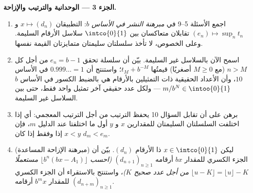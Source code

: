 \begin{problem}
\medskip
\noindent\textbf{الجزء 3 --- الوحدانية والترتيب والإزاحة.}
\begin{enumerate}[resume]
  \item اجمع الأسئلة 5--9 في \emph{مبرهنة النشر في الأساس
        $b$}: التطبيقان $x \mapsto (d_n)$ و $(e_n) \mapsto
        \sup_n t_n$ تقابلان متعاكسان بين
        $\intco{0}{1}$  سلاسل الأرقام السليمة. وعلى
        الخصوص، لا تأخذ سلسلتان سليمتان متمايزتان القيمة نفسها.
  \item اسمح الآن بالسلاسل غير السليمة. بيّن أن سلسلة تحقق $e_n
        = b - 1$ من أجل كل $n > M$ (مع $M \geq 0$ أصغريًا) قيمتُها
        $t_M + b^{-M}$؛ واستنتج أن $0.999\dots = 1$ في
        الأساس $10$، وأن الأعداد الحقيقية ذات التمثيلين
        بالأرقام هي بالضبط الكسور في الأساس $b$
        $m/b^N \in \intoo{0}{1}$ --- ولكل عدد حقيقي آخر تمثيل
        واحد فقط، حتى بين السلاسل غير السليمة.
  \item برهن على أن تقابل السؤال 10 يحفظ
        الترتيب من أجل الترتيب المعجمي: أي إذا اختلفت
        السلسلتان السليمتان للمقدارين $x$ و $y$ أول ما اختلفتا عند الدليل $m$،
        فإن $x < y$ إذا وفقط إذا كان $d_m < e_m$.
  \item (مبرهنة الإزاحة المساعدة) ليكن $x \in \intco{0}{1}$ ذا الأرقام
        $(d_n)$. بيّن أن الجزء الكسري للمقدار $bx$ أرقامه
        $(d_{n+1})_{n \geq 1}$ \emph{(احسب $\lfloor b^n(bx -
        A_1)\rfloor$ مستعملًا $\lfloor u - K \rfloor = \lfloor u
        \rfloor - K$ من أجل عدد صحيح $K$)}، واستنتج بالاستقراء
        أن الجزء الكسري للمقدار $b^m x$ أرقامه
        $(d_{n+m})_{n \geq 1}$.
\end{enumerate}


\end{problem}
